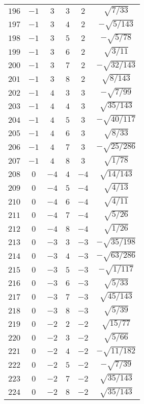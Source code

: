 \begin{table}
\begin{center}
\begin{tabular}{|c|c|c|c|c|c|}
$196$ & $-1$ & $3$ & $3$ & $2$ & $\sqrt{7/33}$ \\ 
$197$ & $-1$ & $3$ & $4$ & $2$ & $-\sqrt{5/143}$ \\ 
$198$ & $-1$ & $3$ & $5$ & $2$ & $-\sqrt{5/78}$ \\ 
$199$ & $-1$ & $3$ & $6$ & $2$ & $\sqrt{3/11}$ \\ 
$200$ & $-1$ & $3$ & $7$ & $2$ & $-\sqrt{32/143}$ \\ 
$201$ & $-1$ & $3$ & $8$ & $2$ & $\sqrt{8/143}$ \\ 
$202$ & $-1$ & $4$ & $3$ & $3$ & $-\sqrt{7/99}$ \\ 
$203$ & $-1$ & $4$ & $4$ & $3$ & $\sqrt{35/143}$ \\ 
$204$ & $-1$ & $4$ & $5$ & $3$ & $-\sqrt{40/117}$ \\ 
$205$ & $-1$ & $4$ & $6$ & $3$ & $\sqrt{8/33}$ \\ 
$206$ & $-1$ & $4$ & $7$ & $3$ & $-\sqrt{25/286}$ \\ 
$207$ & $-1$ & $4$ & $8$ & $3$ & $\sqrt{1/78}$ \\ 
$208$ & $0$ & $-4$ & $4$ & $-4$ & $\sqrt{14/143}$ \\ 
$209$ & $0$ & $-4$ & $5$ & $-4$ & $\sqrt{4/13}$ \\ 
$210$ & $0$ & $-4$ & $6$ & $-4$ & $\sqrt{4/11}$ \\ 
$211$ & $0$ & $-4$ & $7$ & $-4$ & $\sqrt{5/26}$ \\ 
$212$ & $0$ & $-4$ & $8$ & $-4$ & $\sqrt{1/26}$ \\ 
$213$ & $0$ & $-3$ & $3$ & $-3$ & $-\sqrt{35/198}$ \\ 
$214$ & $0$ & $-3$ & $4$ & $-3$ & $-\sqrt{63/286}$ \\ 
$215$ & $0$ & $-3$ & $5$ & $-3$ & $-\sqrt{1/117}$ \\ 
$216$ & $0$ & $-3$ & $6$ & $-3$ & $\sqrt{5/33}$ \\ 
$217$ & $0$ & $-3$ & $7$ & $-3$ & $\sqrt{45/143}$ \\ 
$218$ & $0$ & $-3$ & $8$ & $-3$ & $\sqrt{5/39}$ \\ 
$219$ & $0$ & $-2$ & $2$ & $-2$ & $\sqrt{15/77}$ \\ 
$220$ & $0$ & $-2$ & $3$ & $-2$ & $\sqrt{5/66}$ \\ 
$221$ & $0$ & $-2$ & $4$ & $-2$ & $-\sqrt{11/182}$ \\ 
$222$ & $0$ & $-2$ & $5$ & $-2$ & $-\sqrt{7/39}$ \\ 
$223$ & $0$ & $-2$ & $7$ & $-2$ & $\sqrt{35/143}$ \\ 
$224$ & $0$ & $-2$ & $8$ & $-2$ & $\sqrt{35/143}$ \\ 

\end{tabular}
\end{center}
\end{table}
